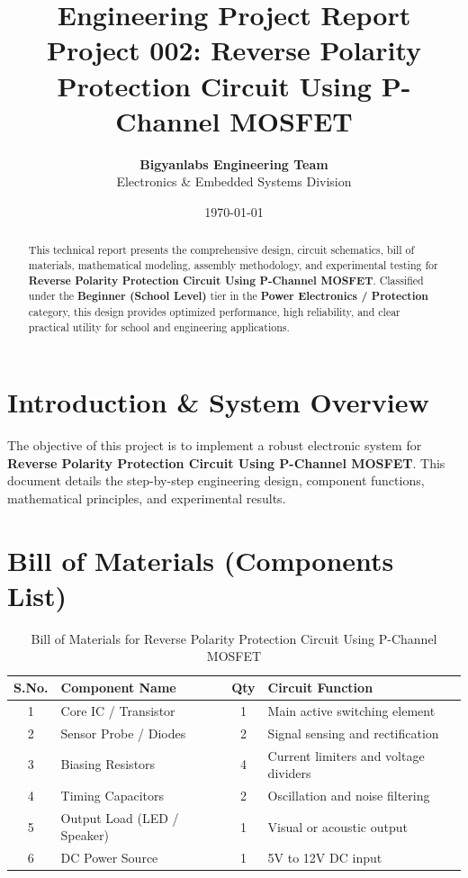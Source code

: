 \documentclass[11pt,a4paper]{article}
\title{\textbf{\Huge Engineering Project Report}\\[0.5em] \Large Project 002: Reverse Polarity Protection Circuit Using P-Channel MOSFET}
\author{\textbf{Bigyanlabs Engineering Team}\\ Electronics \& Embedded Systems Division}
\date{\today}
\begin{document}
\maketitle
\thispagestyle{empty}

\begin{abstract}
This technical report presents the comprehensive design, circuit schematics, bill of materials, mathematical modeling, assembly methodology, and experimental testing for \textbf{Reverse Polarity Protection Circuit Using P-Channel MOSFET}. Classified under the \textbf{Beginner (School Level)} tier in the \textbf{Power Electronics / Protection} category, this design provides optimized performance, high reliability, and clear practical utility for school and engineering applications.
\end{abstract}

\newpage
\tableofcontents
\newpage

\section{Introduction \& System Overview}
The objective of this project is to implement a robust electronic system for \textbf{Reverse Polarity Protection Circuit Using P-Channel MOSFET}. This document details the step-by-step engineering design, component functions, mathematical principles, and experimental results.

\section{Bill of Materials (Components List)}
\begin{table}[h!]
\centering
\caption{Bill of Materials for Reverse Polarity Protection Circuit Using P-Channel MOSFET}
\vspace{0.5em}
\begin{tabular}{clcp{7cm}}
\toprule
\textbf{S.No.} & \textbf{Component Name} & \textbf{Qty} & \textbf{Circuit Function} \\
\midrule
1 & Core IC / Transistor & 1 & Main active switching element \\
2 & Sensor Probe / Diodes & 2 & Signal sensing and rectification \\
3 & Biasing Resistors & 4 & Current limiters and voltage dividers \\
4 & Timing Capacitors & 2 & Oscillation and noise filtering \\
5 & Output Load (LED / Speaker) & 1 & Visual or acoustic output \\
6 & DC Power Source & 1 & 5V to 12V DC input \\
\bottomrule
\end{tabular}
\end{table}
\end{document}
